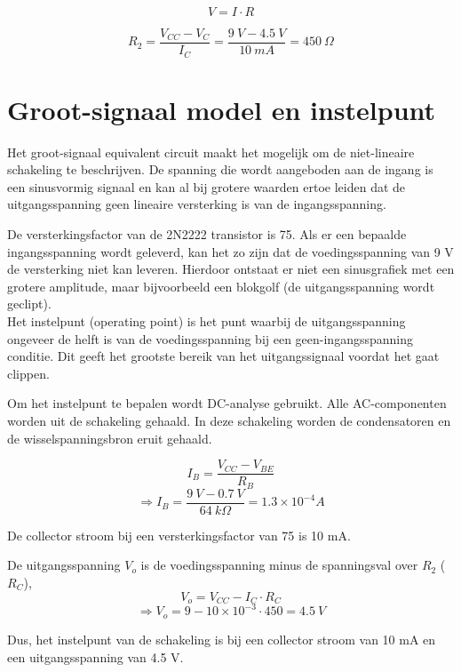 \documentclass{article}
\begin{document}
\begin{equation}
V = I \cdot R 
\end{equation}

$$R_2 = \frac{V_{CC}-V_C}{I_C} = \frac{9\:V-4.5\:V}{10\:mA}=450\: \Omega$$

\section*{Groot-signaal model en instelpunt}

Het groot-signaal equivalent circuit maakt het mogelijk om de niet-lineaire schakeling te beschrijven. De spanning die wordt aangeboden aan de ingang is een sinusvormig signaal en kan al bij grotere waarden ertoe leiden dat de uitgangsspanning geen lineaire versterking is van de ingangsspanning.

De versterkingsfactor van de 2N2222 transistor is 75. Als er een bepaalde ingangsspanning wordt geleverd, kan het zo zijn dat de voedingsspanning van 9 V de versterking niet kan leveren. Hierdoor ontstaat er niet een sinusgrafiek met een grotere amplitude, maar bijvoorbeeld een blokgolf (de uitgangsspanning wordt geclipt).\\

Het instelpunt (operating point) is het punt waarbij de uitgangsspanning ongeveer de helft is van de voedingsspanning bij een geen-ingangsspanning conditie. Dit geeft het grootste bereik van het uitgangssignaal voordat het gaat clippen. 

Om het instelpunt te bepalen wordt DC-analyse gebruikt. Alle AC-componenten worden uit de schakeling gehaald. In deze schakeling worden de condensatoren en de wisselspanningsbron eruit gehaald.

\begin{equation}
I_B=\frac{V_{CC}-V_{BE}}{R_B}
\end{equation}
$$\Rightarrow I_B=\frac{9\: V-0.7 \: V}{64 \: k \Omega}=1.3\times 10^{-4}A$$

\noindent De collector stroom bij een versterkingsfactor van 75 is 10 mA. 

\noindent De uitgangsspanning $V_o$ is de voedingsspanning minus de spanningsval over $R_2$ ($R_C$),
\begin{equation}
V_o=V_{CC}-I_{C} \cdot R_{C}
\end{equation}
$$\Rightarrow V_o=9-10\times 10^{-3}\cdot 450=4.5 \: V$$

\noindent Dus, het instelpunt van de schakeling is bij een collector stroom van 10 mA en een uitgangsspanning van 4.5 V.
\end{document}
